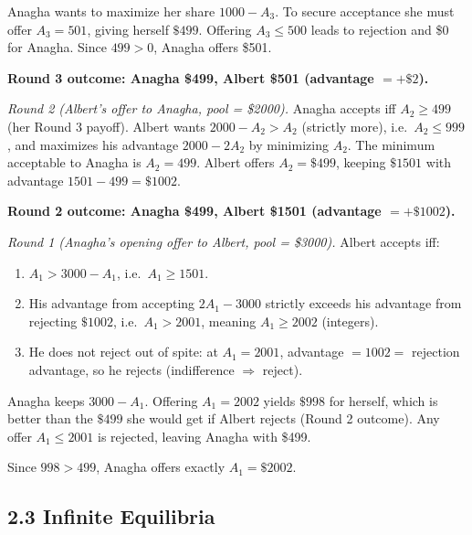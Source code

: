 \documentclass{article}
\begin{document}
Anagha wants to maximize her share $1000 - A_3$. To secure acceptance she must offer $A_3 = 501$, giving herself $\$499$. Offering $A_3 \leq 500$ leads to rejection and \$0 for Anagha. Since $499 > 0$, Anagha offers \$501.

\begin{center}
\textbf{Round 3 outcome: Anagha \$499, Albert \$501 (advantage $= +\$2$).}
\end{center}

\noindent\textit{Round 2 (Albert's offer to Anagha, pool = \$2000).}
Anagha accepts iff $A_2 \geq 499$ (her Round 3 payoff). Albert wants $2000 - A_2 > A_2$ (strictly more), i.e.\ $A_2 \leq 999$, and maximizes his advantage $2000 - 2A_2$ by minimizing $A_2$. The minimum acceptable to Anagha is $A_2 = 499$. Albert offers $A_2 = \$499$, keeping $\$1501$ with advantage $1501 - 499 = \$1002$.

\begin{center}
\textbf{Round 2 outcome: Anagha \$499, Albert \$1501 (advantage $= +\$1002$).}
\end{center}

\noindent\textit{Round 1 (Anagha's opening offer to Albert, pool = \$3000).}
Albert accepts iff:
\begin{enumerate}
    \item $A_1 > 3000 - A_1$, i.e.\ $A_1 \geq 1501$.
    \item His advantage from accepting $2A_1 - 3000$ strictly exceeds his advantage from rejecting $\$1002$, i.e.\ $A_1 > 2001$, meaning $A_1 \geq 2002$ (integers).
    \item He does not reject out of spite: at $A_1 = 2001$, advantage $= 1002 = $ rejection advantage, so he rejects (indifference $\Rightarrow$ reject).
\end{enumerate}

Anagha keeps $3000 - A_1$. Offering $A_1 = 2002$ yields $\$998$ for herself, which is better than the $\$499$ she would get if Albert rejects (Round 2 outcome). Any offer $A_1 \leq 2001$ is rejected, leaving Anagha with \$499.

Since $998 > 499$, Anagha offers exactly $A_1 = \$2002$.

\begin{center}
\end{center}


\newpage
\subsection*{2.3 Infinite Equilibria}
\end{document}
